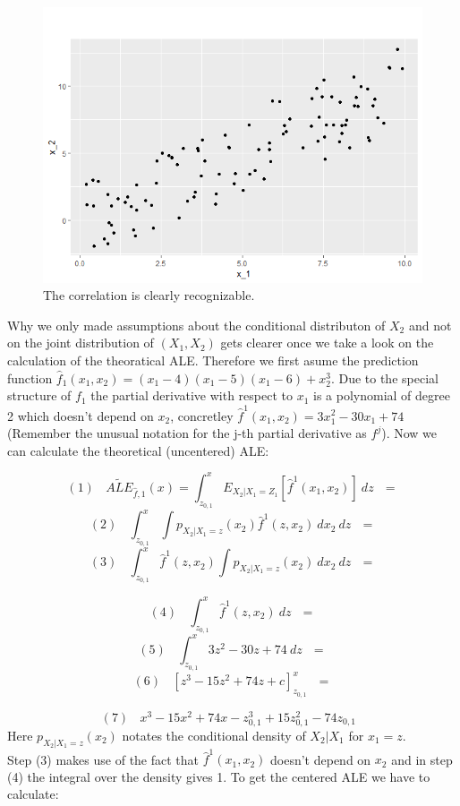 \documentclass[]{krantz}
\begin{document}
\begin{figure}
\includegraphics[width=1\linewidth]{images/ALE_2_Dataset1_} \caption{The correlation is clearly recognizable.}\label{fig:DatasetALE1}
\end{figure}



Why we only made assumptions about the conditional distributon of
\(X_2\) and not on the joint distribution of \((X_1,X_2)\) gets clearer
once we take a look on the calculation of the theoratical ALE. Therefore
we first asume the prediction function
\(\hat{f}_1 (x_1, x_2) = (x_1-4)(x_1-5)(x_1-6) + x_2^3\). Due to the
special structure of \(f_1\) the partial derivative with respect to
\(x_1\) is a polynomial of degree 2 which doesn't depend on \(x_2\),
concretley \(\hat{f}^1(x_1,x_2) = 3x_1^2 -30x_1 +74\) (Remember the
unusual notation for the j-th partial derivative as \(f^{j}\)). Now we
can calculate the theoretical (uncentered) ALE:

\[(1)~~~~\widetilde{ALE}_{\hat{f},1}(x) = \int_{z_{0,1}}^x E_{X_2\vert X_1= Z_1}[\hat{f}^1(x_1,x_2)]~dz~~~=\]
\[(2)~~~~ \int_{z_{0,1}}^x \int p_{X_2\vert X_1 = z }(x_2)\hat{f}^1(z,x_2)~dx_2~dz~~~=\]
\[(3)~~~~ \int_{z_{0,1}}^x \hat{f}^1(z,x_2)\int p_{X_2\vert X_1=z}(x_2)~dx_2~dz~~~=\]

\[(4)~~~~ \int_{z_{0,1}}^x \hat{f}^1(z,x_2)~dz~~~=\]
\[(5)~~~~ \int_{z_{0,1}}^x  3z^2 -30z +74~dz~~~=\]
\[(6)~~~~ [z^3 -15z^2 +74z + c]_{z_{0,1}}^x~~~=\]

\[(7)~~~~ x^3 -15x^2 +74x - z_{0,1} ^ 3 + 15 z_{0,1}^2 - 74z_{0,1}~~~\]
Here \(p_{X_2\vert X_1=z}(x_2)\) notates the conditional density of
\(X_2\vert X_1\) for \(x_1 = z\).\\
Step (3) makes use of the fact that \(\hat{f}^1(x_1,x_2)\) doesn't
depend on \(x_2\) and in step (4) the integral over the density gives 1.
To get the centered ALE we have to calculate:
\end{document}
